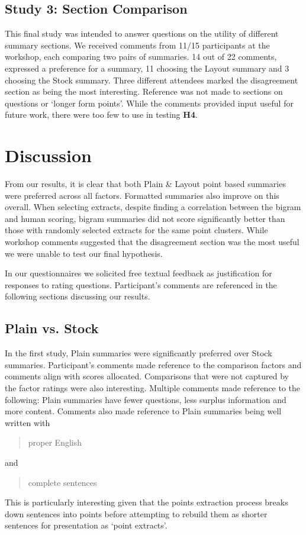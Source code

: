     \tocless\subsection{Study 3: Section Comparison}
      This final study was intended to answer questions on the utility of different summary sections. We received comments from 11/15 participants at the workshop, each comparing two pairs of summaries. 14 out of 22 comments, expressed a preference for a summary, 11 choosing the Layout summary and 3 choosing the Stock summary. Three different attendees marked the disagreement section as being the most interesting. Reference was not made to sections on questions or `longer form points'. While the comments provided input useful for future work, there were too few to use in testing \textbf{H4}.

  \section{Discussion}
    From our results, it is clear that both Plain \& Layout point based summaries were preferred across all factors. Formatted summaries also improve on this overall. When selecting extracts, despite finding a correlation between the bigram and human scoring, bigram summaries did not score significantly better than those with randomly selected extracts for the same point clusters. While workshop comments suggested that the disagreement section was the most useful we were unable to test our final hypothesis.

    In our questionnaires we solicited free textual feedback as justification for responses to rating questions. Participant's comments are referenced in the following sections discussing our results.

    \tocless\subsection{Plain vs. Stock}
      In the first study, Plain summaries were significantly preferred over Stock summaries. Participant's comments made reference to the comparison factors and comments align with scores allocated. Comparisons that were not captured by the factor ratings were also interesting. Multiple comments made reference to the following: Plain summaries have fewer questions, less surplus information and more content. Comments also made reference to Plain summaries being well written with \blockquote{proper English} and \blockquote{complete sentences}. This is particularly interesting given that the points extraction process breaks down sentences into points before attempting to rebuild them as shorter sentences for presentation as `point extracts'.

